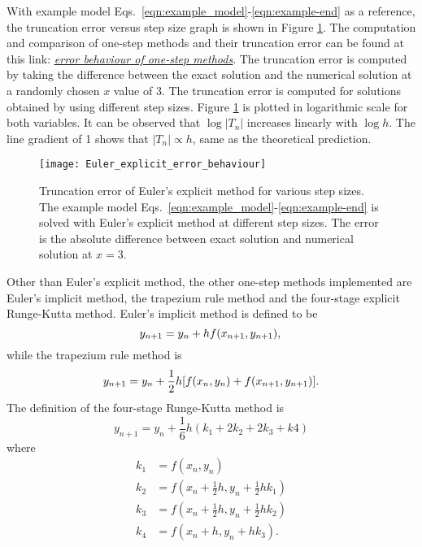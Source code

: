 With example model Eqs.~\eqref{eqn:example_model}-\eqref{eqn:example-end} as a reference, the truncation error versus step size graph is shown in Figure \ref{fig:Euler_explicit_error_behaviour}. The computation and comparison of one-step methods and their truncation error can be found at this link: \href{https://nbviewer.jupyter.org/github/FarmHJ/numerical-solver/blob/main/examples/Onestep_methods_convergence.ipynb}{\underline{\emph{error behaviour of one-step methods}}}. The truncation error is computed by taking the difference between the exact solution and the numerical solution at a randomly chosen $x$ value of 3. The truncation error is computed for solutions obtained by using different step sizes. Figure \ref{fig:Euler_explicit_error_behaviour} is plotted in logarithmic scale for both variables. It can be observed that $\log |T_n|$ increases linearly with $\log h$. The line gradient of 1 shows that $|T_n| \propto h$, same as the theoretical prediction. 

\begin{figure}
    \texttt{[image: Euler\_explicit\_error\_behaviour]}
    \caption{Truncation error of Euler's explicit method for various step sizes. The example model Eqs.~\eqref{eqn:example_model}-\eqref{eqn:example-end} is solved with Euler's explicit method at different step sizes. The error is the absolute difference between exact solution and numerical solution at $x=3$.}
    \label{fig:Euler_explicit_error_behaviour}
\end{figure}

Other than Euler's explicit method, the other one-step methods implemented are Euler's implicit method, the trapezium rule method and the four-stage explicit Runge-Kutta method. Euler's implicit method is defined to be
\begin{equation}
    y_{n+1} = y_n + hf(x_{n+1},y_{n+1}),\\
\end{equation}
while the trapezium rule method is
\begin{equation}
    y_{n+1} = y_n + \frac{1}{2}h[f(x_n,y_n) + f(x_{n+1},y_{n+1})].\\
\end{equation}
The definition of the four-stage Runge-Kutta method is
\begin{equation}
    y_{n+1} = y_n + \frac{1}{6}h(k_1 + 2k_2 + 2k_3 + k4)
\end{equation}
where
\begin{align}
    k_1 &= f(x_n, y_n) \\
    k_2 &= f(x_n + \frac{1}{2}h, y_n + \frac{1}{2}hk_1) \\
    k_3 &= f(x_n + \frac{1}{2}h, y_n + \frac{1}{2}hk_2) \\
    k_4 &= f(x_n + h, y_n + hk_3).
\end{align}

